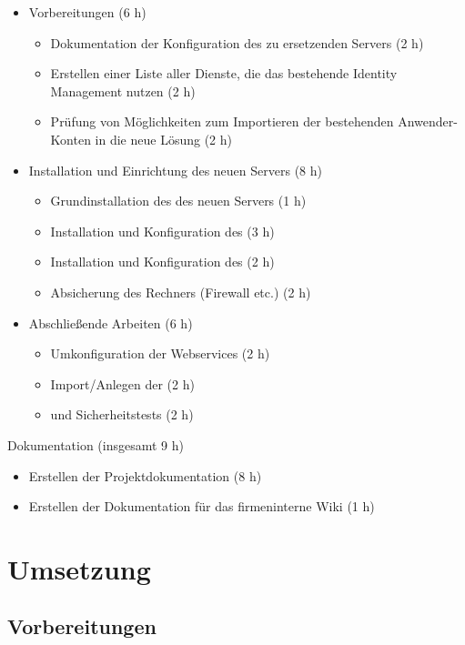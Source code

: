 \documentclass[11pt,a4paper,titlepage=firstiscover]{scrartcl} %
\begin{document}
	\begin{itemize}
	\item Vorbereitungen (6 h)
		\begin{itemize}
		\item Dokumentation der Konfiguration des zu ersetzenden Servers (2 h)
		\item Erstellen einer Liste aller Dienste, die das bestehende Identity 
				Management nutzen (2 h)
		\item Prüfung von Möglichkeiten zum Importieren der bestehenden Anwender-Konten 
				in die neue Lösung (2 h)
		\end{itemize}
	\item Installation und Einrichtung des neuen Servers (8 h)
		\begin{itemize}
		\item Grundinstallation des  des neuen Servers (1 h)
		\item Installation und Konfiguration des  (3 h)
		\item Installation und Konfiguration des  (2 h)
		\item Absicherung des Rechners (Firewall etc.) (2 h)
		\end{itemize}
	\item Abschließende Arbeiten (6 h)
		\begin{itemize}
		\item Umkonfiguration der Webservices (2 h)
		\item Import/Anlegen der  (2 h)
		\item {} und Sicherheitstests (2 h)
		\end{itemize}
	\end{itemize}
Dokumentation (insgesamt 9 h)
	\begin{itemize}
	\item Erstellen der Projektdokumentation (8 h)
	\item Erstellen der Dokumentation für das firmeninterne Wiki (1 h)
	\end{itemize}

\section{Umsetzung}
\subsection{Vorbereitungen}
\end{document}

